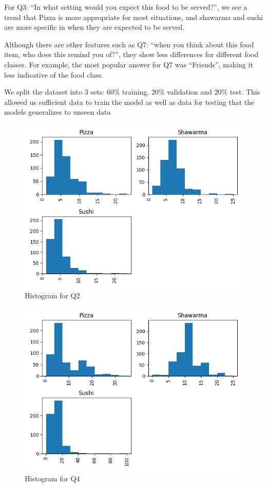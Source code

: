 For Q3: “In what setting would you expect this food to be served?”, we see a trend that Pizza is more appropriate for most situations, and shawarma and sushi are more specific in when they are expected to be served.


Although there are other features such as Q7: “when you think about this food item, who does this remind you of?”, they show less differences for different food classes. For example, the most popular answer for Q7 was “Friends”, making it less indicative of the food class.

We split the dataset into 3 sets: 60\% training, 20\% validation and 20\% test. This allowed us sufficient data to train the model as well as data for testing that the models generalizes to unseen data



\begin{figure}[t!]
    \centerline{\includegraphics[width=\columnwidth]{data/histogram_Q2.png}}
    \caption{Histogram for Q2}
    \label{f:hist_q2}
\end{figure}

\begin{figure}[t!]
    \centerline{\includegraphics[width=\columnwidth]{data/histogram_Q4.png}}
    \caption{Histogram for Q4}
    \label{f:hist_q3}
\end{figure}